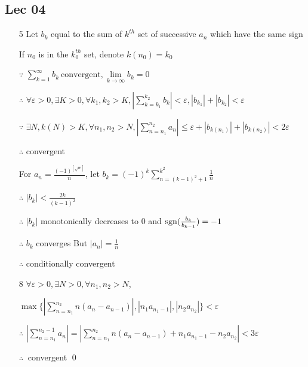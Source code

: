 \subsection{Lec 04}
 \begin{enumerate}[1]
   \item[5]
   Let $b_k$ equal to the sum of $k^{th}$ set of successive $a_n$ which have the same sign
   \par If $n_0$ is in the $k_0^{th}$ set, denote $k(n_0)=k_0$
   \par $\because$ $ \sum\limits_{k=1}^{\infty}b_k \ \text{convergent}, \lim\limits_{k\rightarrow\infty}b_k=0$ 
   \par $\therefore$ $\forall \varepsilon >0, \exists K>0, \forall k_1,k_2>K, |\sum\limits_{k=k_1}^{k_2}b_k|<\varepsilon, |b_{k_1}|+|b_{k_2}|<\varepsilon$
   \par $\because $ $\exists N, k(N)>K,\forall n_1,n_2>N,|\sum\limits_{n=n_1}^{n_2}a_n|\leqslant\varepsilon+|b_{k(n_1)}|+|b_{k(n_2)}|<2\varepsilon$
   \par $\therefore$ convergent
   \par For $a_n=\frac{(-1)^{[\sqrt{n}]}}{n}$, let $b_k=(-1)^k\sum\limits_{n=(k-1)^2+1}^{k^2}\frac{1}{n}$
   \par $\therefore$ $|b_k|<\frac{2k}{(k-1)^2}$
   \par $\therefore$ $|b_k|$ monotonically decreases to $0$ and $\mathop{\mathrm{sgn}} (\frac{b_k}{b_{k-1}})=-1$
   \par $\therefore$ $b_k$ converges
   But $|a_n|=\frac{1}{n}$
   \par $\therefore$ conditionally convergent

   \item[8]
   $\forall \varepsilon >0, \exists N>0, \forall n_1,n_2>N$,
   \par $\max \{|\sum\limits_{n=n_1}^{n_2}n(a_n-a_{n-1})|, |n_1a_{n_1-1}| ,|n_2a_{n_2}|\}<\varepsilon$
   \par $\therefore$ $|\sum\limits_{n=n_1}^{n_2-1}a_n|=|\sum\limits_{n=n_1}^{n_2}n(a_n-a_{n-1})+n_1a_{n_1-1}-n_2a_{n_2}|<3\varepsilon$
   \par $ \therefore \ $ convergent \qed
   \end{enumerate}

